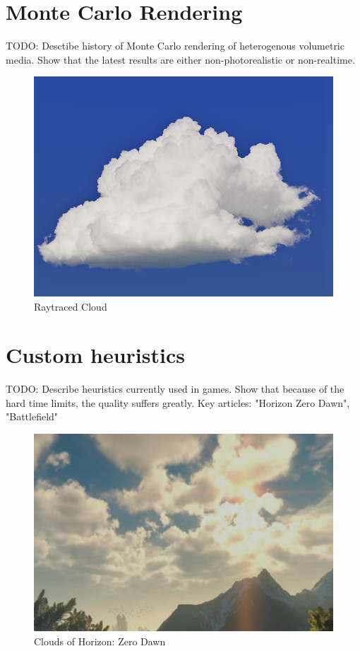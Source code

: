 \documentclass[times,specification,annotation]{itmo-student-thesis}
\begin{document}
\startrelatedwork

\section{Monte Carlo Rendering}\label{sec:MonteCarlo}
TODO: Desctibe history of Monte Carlo rendering of heterogenous volumetric media. Show that the latest results are either non-photorealistic or non-realtime.
\begin{figure}[!h]
    \caption{Raytraced Cloud}\label{fig:RaytracedCloud}
    \centering
    \includegraphics[width=\textwidth]{RaytracedCloud}
\end{figure}

\section{Custom heuristics}\label{sec:heuristics}
TODO: Describe heuristics currently used in games. Show that because of the hard time limits, the quality suffers greatly. Key articles: "Horizon Zero Dawn", "Battlefield"
\begin{figure}[!h]
    \caption{Clouds of Horizon: Zero Dawn}\label{fig:HorizonZeroDawn}
    \centering
    \includegraphics[width=\textwidth]{HorizonZeroDawn}
\end{figure}
\end{document}
